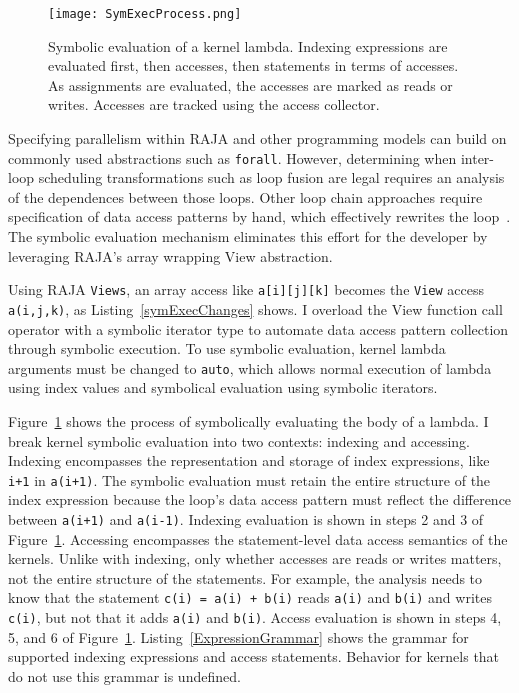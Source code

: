 \begin{figure}
\texttt{[image: SymExecProcess.png]}
\caption{Symbolic evaluation of a kernel lambda. 
Indexing expressions are evaluated first, then accesses, then statements in terms of accesses.
As assignments are evaluated, the accesses are marked as reads or writes.
Accesses are tracked using the access collector.}\label{symExec}
\end{figure}
Specifying parallelism within RAJA and other programming models can
build on commonly used abstractions such as \verb.forall..
However, determining when inter-loop scheduling transformations such as
loop fusion are legal requires an analysis of the dependences between those loops.
Other loop chain approaches require specification of data access patterns by
hand, which effectively rewrites the loop~\cite{bertolacci2019using}.
The symbolic evaluation mechanism eliminates this effort for the
developer by leveraging RAJA's array wrapping View abstraction.

Using RAJA \verb.Views.,
an array access like \verb.a[i][j][k]. becomes the \verb.View. access \verb.a(i,j,k)., as
Listing~\ref{symExecChanges} shows.
I overload the View function call operator with a symbolic iterator type to automate
data access pattern collection through symbolic execution.
To use symbolic evaluation, kernel lambda arguments must be changed to
\verb.auto., which allows normal execution of lambda using index values and 
symbolical evaluation using symbolic iterators.

Figure~\ref{symExec} shows the process of symbolically evaluating the body of a lambda. 
I break kernel symbolic evaluation into two contexts: indexing and accessing. 
Indexing encompasses the representation and storage of index expressions, like
\verb.i+1. in \verb.a(i+1)..
The symbolic evaluation must retain the entire structure of the index expression 
because the loop's
data access pattern must reflect the difference between \verb.a(i+1). and
\verb.a(i-1)..
Indexing evaluation is shown in steps 2 and 3 of Figure~\ref{symExec}.
Accessing encompasses the statement-level data access semantics of the kernels.
Unlike with indexing, only whether accesses are reads or writes matters,
not the entire structure of the statements.
For example, the analysis needs to know that the statement \verb.c(i) = a(i) + b(i).
reads \verb.a(i). and \verb.b(i). and writes \verb.c(i)., but not that it
adds \verb.a(i). and \verb.b(i)..
Access evaluation is shown in steps 4, 5, and 6 of Figure~\ref{symExec}.
Listing~\ref{ExpressionGrammar} shows the grammar for supported indexing expressions and access statements. 
Behavior for kernels that do not use this grammar is undefined.

